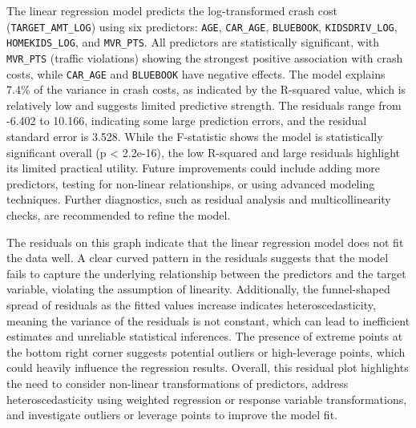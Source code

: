 \documentclass[
]{article}
\begin{document}
The linear regression model predicts the log-transformed crash cost
(\texttt{TARGET\_AMT\_LOG}) using six predictors: \texttt{AGE},
\texttt{CAR\_AGE}, \texttt{BLUEBOOK}, \texttt{KIDSDRIV\_LOG},
\texttt{HOMEKIDS\_LOG}, and \texttt{MVR\_PTS}. All predictors are
statistically significant, with \texttt{MVR\_PTS} (traffic violations)
showing the strongest positive association with crash costs, while
\texttt{CAR\_AGE} and \texttt{BLUEBOOK} have negative effects. The model
explains 7.4\% of the variance in crash costs, as indicated by the
R-squared value, which is relatively low and suggests limited predictive
strength. The residuals range from -6.402 to 10.166, indicating some
large prediction errors, and the residual standard error is 3.528. While
the F-statistic shows the model is statistically significant overall (p
\textless{} 2.2e-16), the low R-squared and large residuals highlight
its limited practical utility. Future improvements could include adding
more predictors, testing for non-linear relationships, or using advanced
modeling techniques. Further diagnostics, such as residual analysis and
multicollinearity checks, are recommended to refine the model.

The residuals on this graph indicate that the linear regression model
does not fit the data well. A clear curved pattern in the residuals
suggests that the model fails to capture the underlying relationship
between the predictors and the target variable, violating the assumption
of linearity. Additionally, the funnel-shaped spread of residuals as the
fitted values increase indicates heteroscedasticity, meaning the
variance of the residuals is not constant, which can lead to inefficient
estimates and unreliable statistical inferences. The presence of extreme
points at the bottom right corner suggests potential outliers or
high-leverage points, which could heavily influence the regression
results. Overall, this residual plot highlights the need to consider
non-linear transformations of predictors, address heteroscedasticity
using weighted regression or response variable transformations, and
investigate outliers or leverage points to improve the model fit.
\end{document}
